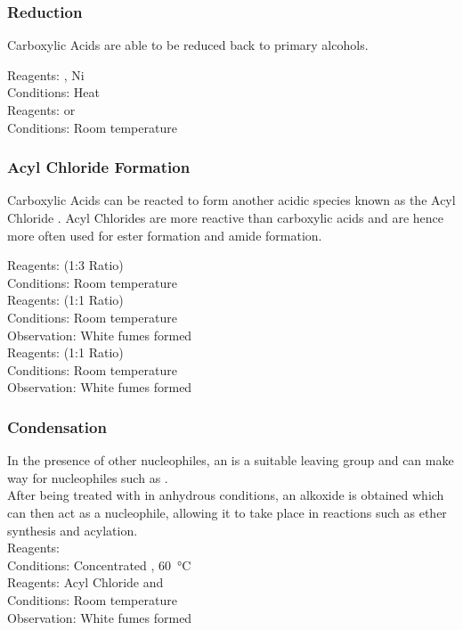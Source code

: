 \documentclass[../main]{subfiles}
\begin{document}
	\subsubsection{Reduction}

	Carboxylic Acids are able to be reduced back to primary alcohols.

	Reagents: , Ni \\
	Conditions: Heat \\

	Reagents:  or \\
	Conditions: Room temperature \\

	\subsubsection{Acyl Chloride Formation}

	Carboxylic Acids can be reacted to form another acidic species known as the Acyl Chloride . Acyl Chlorides are more reactive than carboxylic acids and are hence more often used for ester formation and amide formation.

	Reagents:  (1:3 Ratio) \\
	Conditions:  Room temperature \\

	Reagents:  (1:1 Ratio) \\
	Conditions:  Room temperature \\
	Observation: White fumes formed  \\

	Reagents:  (1:1 Ratio) \\
	Conditions:  Room temperature \\
	Observation: White fumes formed  \\

	\subsubsection{Condensation}

	In the presence of other nucleophiles, an  is a suitable leaving group and can make way for nucleophiles such as . \\

	After being treated with  in anhydrous conditions, an alkoxide  is obtained which can then act as a nucleophile, allowing it to take place in reactions such as ether synthesis and acylation. \\

	Reagents:  \\
	Conditions:  Concentrated , \SI{60}{\celsius} \\

	Reagents: Acyl Chloride and  \\
	Conditions:  Room temperature \\
	Observation: White fumes formed  \\
	
\end{document}
